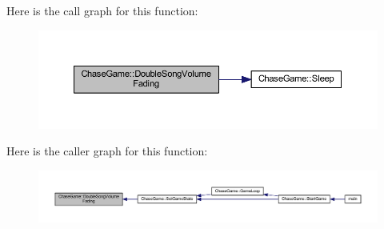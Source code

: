 Here is the call graph for this function\-:
\nopagebreak
\begin{figure}[H]
\begin{center}
\leavevmode
\includegraphics[width=350pt]{namespace_chase_game_a1fafa6862bb2df06c93d286361fefaa4_cgraph}
\end{center}
\end{figure}




Here is the caller graph for this function\-:
\nopagebreak
\begin{figure}[H]
\begin{center}
\leavevmode
\includegraphics[width=350pt]{namespace_chase_game_a1fafa6862bb2df06c93d286361fefaa4_icgraph}
\end{center}
\end{figure}


